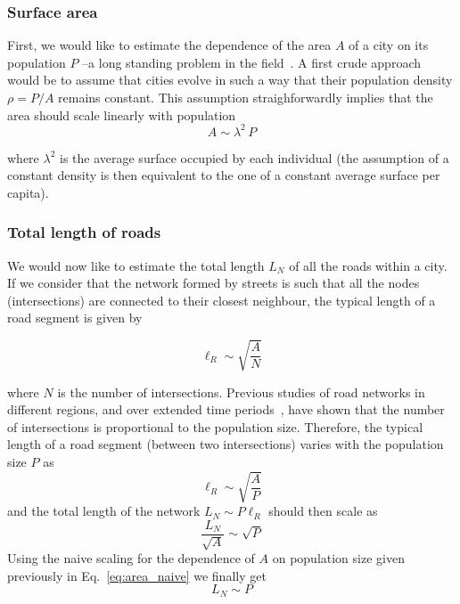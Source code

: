 \subsubsection{Surface area} 

First, we would like to estimate the dependence of the area $A$ of a city on its population $P$ --a long standing problem in the field~\cite{Makse:1995}. A first crude approach would be to assume that cities evolve in such a way that their population density $\rho = P/A$ remains constant. This assumption straighforwardly implies that the area should scale linearly with population
%
\begin{equation}
A \sim \lambda^2\, P
\label{eq:area_naive}
\end{equation}

where $\lambda^2$ is the average surface occupied by each individual (the assumption of a constant density is then equivalent to the one of a constant average surface per capita).

\subsubsection{Total length of roads} 

We would now like to estimate the total length $L_N$ of all the roads within a city. If we consider that the network formed by streets is such that all the nodes (intersections) are connected to their closest neighbour, the typical length of a road segment is given by

\begin{equation}
\ell_R \sim \sqrt{\frac{A}{N}}
\end{equation}

where $N$ is the number of intersections. Previous studies of road networks in different regions, and over extended time periods~\cite{Strano:2012,Barthelemy:2013}, have shown that the number of intersections is proportional to the population size. Therefore, the typical length of a road segment (between two intersections) varies with the population size $P$ as
%
\begin{equation}
\ell_R \sim \sqrt{\frac{A}{P}}
\end{equation}
%
and the total length of the network $L_N \sim P\ell_R$ should then scale as
%
\begin{equation}
\frac{L_N}{\sqrt{A}}\sim\sqrt{P}
\end{equation}
%
Using the naive scaling for the dependence of $A$ on population size given previously in Eq.~\ref{eq:area_naive} we finally get
\begin{equation}
L_N \sim P
\end{equation}


